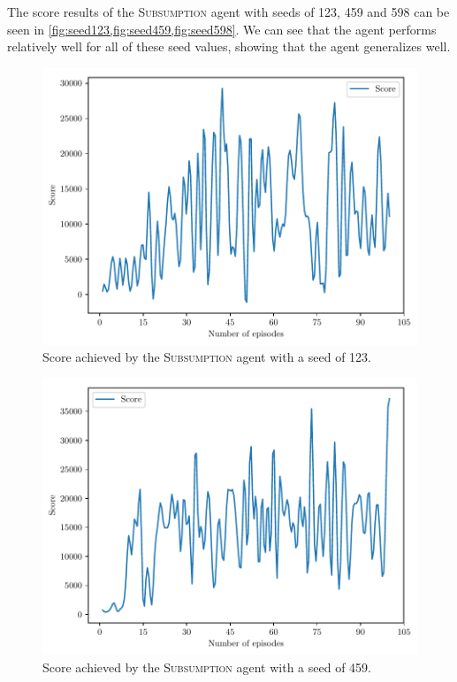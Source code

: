 \documentclass[a4paper,titlepage]{article}
\begin{document}
	The score results of the \textsc{Subsumption} agent with seeds of 123, 459 and 598 can be seen in \cref{fig:seed123,fig:seed459,fig:seed598}. We can see that the agent performs relatively well for all of these seed values, showing that the agent generalizes well.
	
	\begin{figure}[!htb]
		\centering
		\includegraphics[width=\columnwidth]{plots/seed123.pdf}
		\caption
		{Score achieved by the \textsc{Subsumption} agent with a seed of 123.}
		\label{fig:seed123}
	\end{figure}
	
	\begin{figure}[!htb]
		\centering
		\includegraphics[width=\columnwidth]{plots/seed459.pdf}
		\caption
		{Score achieved by the \textsc{Subsumption} agent with a seed of 459.}
		\label{fig:seed459}
	\end{figure}
\end{document}
